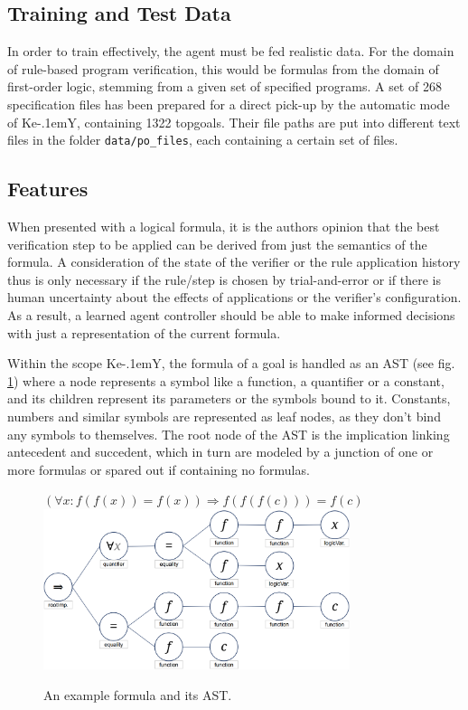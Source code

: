 \documentclass[runningheads,a4paper]{llncs}
\begin{document}
\subsection*{Training and Test Data}

In order to train effectively, the agent must be fed realistic data. For the domain of rule-based program verification, this would be formulas from the domain of first-order logic, stemming from a given set of specified programs. A set of 268 specification files has been prepared for a direct pick-up by the automatic mode of Ke\kern-.1em{Y}, containing 1322 topgoals. Their file paths are put into different text files in the folder \texttt{data/po\_files}, each containing a certain set of files.

\subsection*{Features}

When presented with a logical formula, it is the authors opinion that the best verification step to be applied can be derived from just the semantics of the formula. A consideration of the state of the verifier or the rule application history thus is only necessary if the rule/step is chosen by trial-and-error or if there is human uncertainty about the effects of applications or the verifier's configuration. As a result, a learned agent controller should be able to make informed decisions with just a representation of the current formula.

Within the scope Ke\kern-.1em{Y}, the formula of a goal is handled as an AST (see fig. \ref{f:ast}) where a node represents a symbol like a function, a quantifier or a constant, and its children represent its parameters or the symbols bound to it. Constants, numbers and similar symbols are represented as leaf nodes, as they don't bind any symbols to themselves. The root node of the AST is the implication linking antecedent and succedent, which in turn are modeled by a junction of one or more formulas or spared out if containing no formulas.

\begin{figure}[!htb]
	\centering
	{\Large$(\forall x: f(f(x)) = f(x)) \Rightarrow f(f(f(c))) = f(c)$}
	\includegraphics[width=0.8\textwidth]{img/goal_ast.png}
	\caption{An example formula and its AST.}
	\label{f:ast}
\end{figure}
\end{document}
